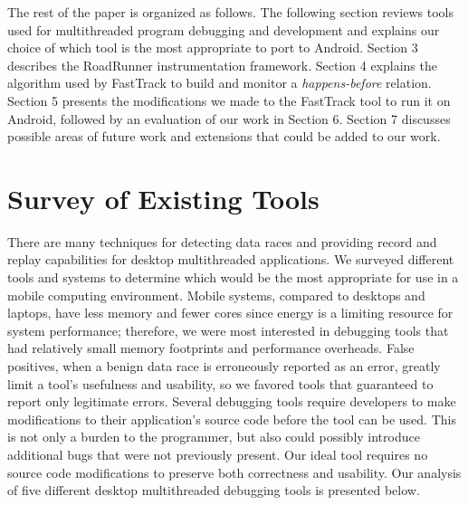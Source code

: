 \documentclass{acm_proc_article-sp}
\begin{document}
The rest of the paper is organized as follows. The following section reviews tools used for multithreaded program debugging and development and explains our choice of which tool is the most appropriate to port to Android. Section 3 describes the  RoadRunner instrumentation framework. Section 4 explains the algorithm used by FastTrack to build and monitor a \emph{happens-before} relation. Section 5 presents the modifications we made to the FastTrack tool to run it on Android, followed by an evaluation of our work in Section 6. Section 7 discusses possible areas of future work and extensions that could be added to our work.

\section{Survey of Existing Tools}
There are many techniques for detecting data races and providing record and replay capabilities for desktop multithreaded applications. We surveyed different tools and systems to determine which would be the most appropriate for use in a mobile computing environment. Mobile systems, compared to desktops and laptops, have less memory and fewer cores since energy is a limiting resource for system performance; therefore, we were most interested in debugging tools that had relatively small memory footprints and performance overheads. False positives, when a benign data race is erroneously reported as an error, greatly limit a tool's usefulness and usability, so we favored tools that guaranteed to report only legitimate errors. Several debugging tools require developers to make modifications to their application's source code before the tool can be used. This is not only a burden to the programmer, but also could possibly introduce additional bugs that were not previously present. Our ideal tool requires no source code modifications to preserve both correctness and usability. Our analysis of five different desktop multithreaded debugging tools is presented below.
\end{document}
